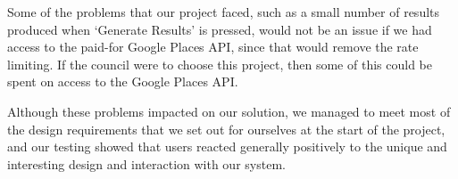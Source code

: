\documentclass[10pt,a4paper]{article}
\begin{document}
Some of the problems that our project faced, such as a small number of results produced when ‘Generate Results’ is pressed, would not be an issue if we had access to the paid-for Google Places API, since that would remove the rate limiting. If the council were to choose this project, then some of this could be spent on access to the Google Places API.

Although these problems impacted on our solution, we managed to meet most of the design requirements that we set out for ourselves at the start of the project, and our testing showed that users reacted generally positively to the unique and interesting design and interaction with our system. 
\end{document}
